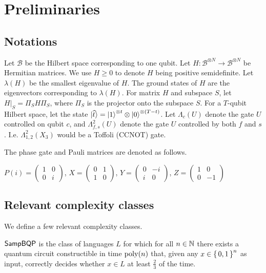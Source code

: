 \section{Preliminaries}

\subsection{Notations}

Let $\mathcal{B}$ be the Hilbert space corresponding to one qubit. Let $H:\mathcal{B}^{\otimes N}\rightarrow\mathcal{B}^{\otimes N}$ be Hermitian matrices. We use $H\geq0$ to denote $H$ being positive semidefinite. Let $\lambda(H)$ be the smallest eigenvalue of $H$. The ground states of $H$ are the eigenvectors corresponding to $\lambda(H)$. For matrix $H$ and subspace $S$, let $H\big|_S=\Pi_S H \Pi_S$, where $\Pi_S$ is the projector onto the subspace $S$. For a $T$-qubit Hilbert space, let the state $\ket{\widehat{t}}=\ket{1}^{\otimes t}\otimes \ket{0}^{{\otimes (T-t)}}$. Let $\Lambda_c(U)$ denote the gate $U$ controlled on qubit $c$, and $\Lambda^2_{f, s}(U)$ denote the gate $U$ controlled by both $f$ and $s$. I.e. $\Lambda^2_{1, 2}(X_3)$ would be a Toffoli (CCNOT) gate. 

The phase gate and Pauli matrices are denoted as follows.

\begin{definition}
	$P(i)=\begin{pmatrix}1&0\\0&i\end{pmatrix}$, $X=\begin{pmatrix}0&1\\1&0\end{pmatrix}$,
	$Y=\begin{pmatrix}0&-i\\i&0\end{pmatrix}$,
	$Z=\begin{pmatrix}1&0\\0&-1\end{pmatrix}$
\end{definition}

\subsection{Relevant complexity classes}

We define a few relevant complexity classes.

\begin{definition} [$\BQP$]
	$\operatorname{\mathsf{SampBQP}}$ is the class of languages $L$ for which for all $n\in\mathbb{N}$ there exists a quantum circuit constructible in time $\operatorname*{\operatorname{poly}}(n)$ that, given any $x\in\set{0, 1}^n$ as input, correctly decides whether $x\in L$ at least $\frac{2}{3}$ of the time.
\end{definition}

